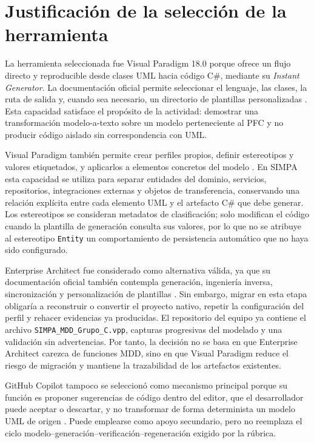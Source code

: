 \documentclass[11pt,a4paper]{article}
\begin{document}
\section{Justificación de la selección de la herramienta}

La herramienta seleccionada fue Visual Paradigm 18.0 porque ofrece un flujo directo y
reproducible desde clases UML hacia código C\#, mediante su \textit{Instant Generator}.
La documentación oficial permite seleccionar el lenguaje, las clases, la ruta de salida y,
cuando sea necesario, un directorio de plantillas personalizadas
\cite{vpInstantCSharp}. Esta capacidad satisface el propósito de la actividad: demostrar una
transformación modelo-a-texto sobre un modelo perteneciente al PFC y no producir código
aislado sin correspondencia con UML.

Visual Paradigm también permite crear perfiles propios, definir estereotipos y valores
etiquetados, y aplicarlos a elementos concretos del modelo
\cite{vpProfileDiagram,vpApplyStereotype}. En SIMPA esta capacidad se utiliza para separar
entidades del dominio, servicios, repositorios, integraciones externas y objetos de
transferencia, conservando una relación explícita entre cada elemento UML y el artefacto
C\# que debe generar. Los estereotipos se consideran metadatos de clasificación; solo
modifican el código cuando la plantilla de generación consulta sus valores, por lo que no
se atribuye al estereotipo \texttt{Entity} un comportamiento de persistencia automático que
no haya sido configurado.

Enterprise Architect fue considerado como alternativa válida, ya que su documentación
oficial también contempla generación, ingeniería inversa, sincronización y personalización
de plantillas \cite{eaCodeEngineering}. Sin embargo, migrar en esta etapa obligaría a
reconstruir o convertir el proyecto nativo, repetir la configuración del perfil y rehacer
evidencias ya producidas. El repositorio del equipo ya contiene el archivo
\texttt{SIMPA\_MDD\_Grupo\_C.vpp}, capturas progresivas del modelado y una validación
sin advertencias. Por tanto, la decisión no se basa en que Enterprise Architect carezca de
funciones MDD, sino en que Visual Paradigm reduce el riesgo de migración y mantiene la
trazabilidad de los artefactos existentes.

GitHub Copilot tampoco se seleccionó como mecanismo principal porque su función es
proponer sugerencias de código dentro del editor, que el desarrollador puede aceptar o
descartar, y no transformar de forma determinista un modelo UML de origen
\cite{githubCopilotSuggestions}. Puede emplearse como apoyo secundario, pero no reemplaza
el ciclo modelo--generación--verificación--regeneración exigido por la rúbrica.
\end{document}
